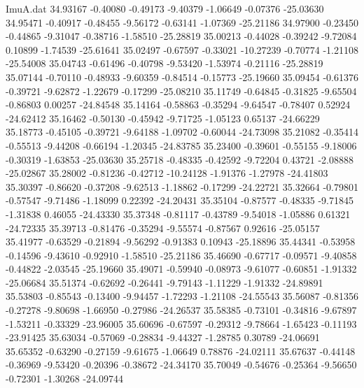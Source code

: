 \begin{filecontents}{ImuA.dat}
  34.93167   -0.40080   -0.49173   -9.40379   -1.06649   -0.07376  -25.03630
  34.95471   -0.40917   -0.48455   -9.56172   -0.63141   -1.07369  -25.21186
  34.97900   -0.23450   -0.44865   -9.31047   -0.38716   -1.58510  -25.28819
  35.00213   -0.44028   -0.39242   -9.72084    0.10899   -1.74539  -25.61641
  35.02497   -0.67597   -0.33021  -10.27239   -0.70774   -1.21108  -25.54008
  35.04743   -0.61496   -0.40798   -9.53420   -1.53974   -0.21116  -25.28819
  35.07144   -0.70110   -0.48933   -9.60359   -0.84514   -0.15773  -25.19660
  35.09454   -0.61376   -0.39721   -9.62872   -1.22679   -0.17299  -25.08210
  35.11749   -0.64845   -0.31825   -9.65504   -0.86803    0.00257  -24.84548
  35.14164   -0.58863   -0.35294   -9.64547   -0.78407    0.52924  -24.62412
  35.16462   -0.50130   -0.45942   -9.71725   -1.05123    0.65137  -24.66229
  35.18773   -0.45105   -0.39721   -9.64188   -1.09702   -0.60044  -24.73098
  35.21082   -0.35414   -0.55513   -9.44208   -0.66194   -1.20345  -24.83785
  35.23400   -0.39601   -0.55155   -9.18006   -0.30319   -1.63853  -25.03630
  35.25718   -0.48335   -0.42592   -9.72204    0.43721   -2.08888  -25.02867
  35.28002   -0.81236   -0.42712  -10.24128   -1.91376   -1.27978  -24.41803
  35.30397   -0.86620   -0.37208   -9.62513   -1.18862   -0.17299  -24.22721
  35.32664   -0.79801   -0.57547   -9.71486   -1.18099    0.22392  -24.20431
  35.35104   -0.87577   -0.48335   -9.71845   -1.31838    0.46055  -24.43330
  35.37348   -0.81117   -0.43789   -9.54018   -1.05886    0.61321  -24.72335
  35.39713   -0.81476   -0.35294   -9.55574   -0.87567    0.92616  -25.05157
  35.41977   -0.63529   -0.21894   -9.56292   -0.91383    0.10943  -25.18896
  35.44341   -0.53958   -0.14596   -9.43610   -0.92910   -1.58510  -25.21186
  35.46690   -0.67717   -0.09571   -9.40858   -0.44822   -2.03545  -25.19660
  35.49071   -0.59940   -0.08973   -9.61077   -0.60851   -1.91332  -25.06684
  35.51374   -0.62692   -0.26441   -9.79143   -1.11229   -1.91332  -24.89891
  35.53803   -0.85543   -0.13400   -9.94457   -1.72293   -1.21108  -24.55543
  35.56087   -0.81356   -0.27278   -9.80698   -1.66950   -0.27986  -24.26537
  35.58385   -0.73101   -0.34816   -9.67897   -1.53211   -0.33329  -23.96005
  35.60696   -0.67597   -0.29312   -9.78664   -1.65423   -0.11193  -23.91425
  35.63034   -0.57069   -0.28834   -9.44327   -1.28785    0.30789  -24.06691
  35.65352   -0.63290   -0.27159   -9.61675   -1.06649    0.78876  -24.02111
  35.67637   -0.44148   -0.36969   -9.53420   -0.20396   -0.38672  -24.34170
  35.70049   -0.54676   -0.25364   -9.56650   -0.72301   -1.30268  -24.09744

\end{filecontents}
